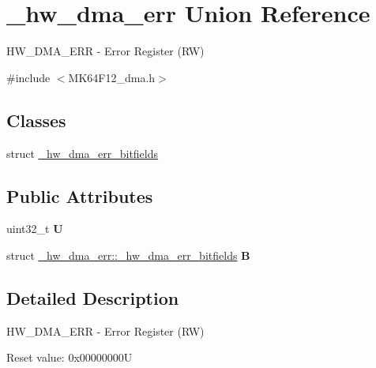 \hypertarget{union__hw__dma__err}{}\section{\+\_\+hw\+\_\+dma\+\_\+err Union Reference}
\label{union__hw__dma__err}


H\+W\+\_\+\+D\+M\+A\+\_\+\+E\+RR -\/ Error Register (RW)  




{\ttfamily \#include $<$M\+K64\+F12\+\_\+dma.\+h$>$}

\subsection*{Classes}
\begin{DoxyCompactItemize}
\item 
struct \hyperlink{struct__hw__dma__err_1_1__hw__dma__err__bitfields}{\+\_\+hw\+\_\+dma\+\_\+err\+\_\+bitfields}
\end{DoxyCompactItemize}
\subsection*{Public Attributes}
\begin{DoxyCompactItemize}
\item 
uint32\+\_\+t {\bfseries U}\hypertarget{union__hw__dma__err_a03accac837a3284b179fb9b7223c8b2a}{}\label{union__hw__dma__err_a03accac837a3284b179fb9b7223c8b2a}

\item 
struct \hyperlink{struct__hw__dma__err_1_1__hw__dma__err__bitfields}{\+\_\+hw\+\_\+dma\+\_\+err\+::\+\_\+hw\+\_\+dma\+\_\+err\+\_\+bitfields} {\bfseries B}\hypertarget{union__hw__dma__err_a91944daeb6e5afbb17faf5f7a02cc68d}{}\label{union__hw__dma__err_a91944daeb6e5afbb17faf5f7a02cc68d}

\end{DoxyCompactItemize}


\subsection{Detailed Description}
H\+W\+\_\+\+D\+M\+A\+\_\+\+E\+RR -\/ Error Register (RW) 

Reset value\+: 0x00000000U

